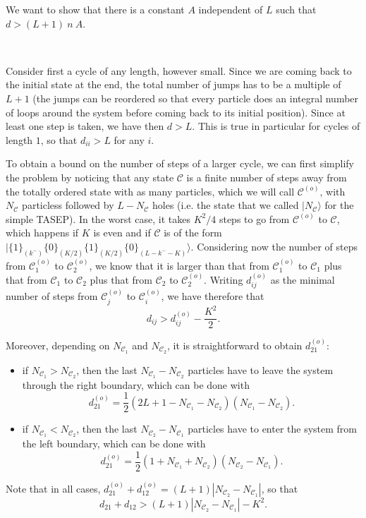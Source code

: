 \documentclass[aps,pre,onecolumn,showpacs,showkeys,a4paper]{revtex4-1}
\begin{document}
We want to show that there is a constant $A$ independent of $L$ such that $d>(L+1)~n~A$.

~~

Consider first a cycle of any length, however small. Since we are coming back to the initial state at the end, the total number of jumps has to be a multiple of $L+1$ (the jumps can be reordered so that every particle does an integral number of loops around the system before coming back to its initial position). Since at least one step is taken, we have then $d>L$. This is true in particular for cycles of length $1$, so that $d_{ii}>L$ for any $i$.

To obtain a bound on the number of steps of a larger cycle, we can first simplify the problem by noticing that any state $\mathcal{C}$ is a finite number of steps away from the totally ordered state with as many particles, which we will call $\mathcal{C}^{(o)}$, with $N_{\mathcal{C}}$ particless followed by $L-N_{\mathcal{C}}$ holes (i.e. the state that we called $|N_{\mathcal{C}}\rangle$ for the simple TASEP). In the worst case, it takes $K^2/4$ steps to go from $\mathcal{C}^{(o)}$ to $\mathcal{C}$, which happens if $K$ is even and if $\mathcal{C}$ is of the form $|\{1\}_{(k^-)} \{0\}_{(K/2)}\{1\}_{(K/2)}\{0\}_{(L-k^--K)}\rangle$. Considering now the number of steps from $\mathcal{C}_1^{(o)}$ to $\mathcal{C}_2^{(o)}$, we know that it is larger than that from $\mathcal{C}_1^{(o)}$ to $\mathcal{C}_1$ plus that from $\mathcal{C}_1$ to $\mathcal{C}_2$ plus that from $\mathcal{C}_2$ to $\mathcal{C}_2^{(o)}$. Writing $d_{ij}^{(o)}$ as the minimal number of steps from $\mathcal{C}_j^{(o)}$ to $\mathcal{C}_i^{(o)}$, we have therefore that
\begin{equation}
d_{ij}>d_{ij}^{(o)}-\frac{K^2}{2}.
\end{equation}

Moreover, depending on $N_{\mathcal{C}_1}$ and $N_{\mathcal{C}_2}$, it is straightforward to obtain $d_{21}^{(o)}$: 
\begin{itemize}
\item if $N_{\mathcal{C}_1}>N_{\mathcal{C}_2}$, then the last $N_{\mathcal{C}_1}-N_{\mathcal{C}_2}$ particles have to leave the system through the right boundary, which can be done with
\begin{equation}
d_{21}^{(o)}=\frac{1}{2}(2L+1-N_{\mathcal{C}_1}-N_{\mathcal{C}_2})(N_{\mathcal{C}_1}-N_{\mathcal{C}_2}).
\end{equation}
\item if $N_{\mathcal{C}_1}<N_{\mathcal{C}_2}$, then the last $N_{\mathcal{C}_2}-N_{\mathcal{C}_1}$ particles have to enter the system from the left boundary, which can be done with
\begin{equation}
d_{21}^{(o)}=\frac{1}{2}(1+N_{\mathcal{C}_1}+N_{\mathcal{C}_2})(N_{\mathcal{C}_2}-N_{\mathcal{C}_1}).
\end{equation}
\end{itemize}
Note that in all cases, $d_{21}^{(o)}+d_{12}^{(o)}=(L+1)|N_{\mathcal{C}_2}-N_{\mathcal{C}_1}|$, so that
\begin{equation}
d_{21}+d_{12}>(L+1)|N_{\mathcal{C}_2}-N_{\mathcal{C}_1}|-K^2.
\end{equation}
\end{document}
